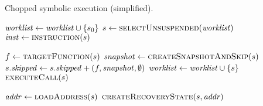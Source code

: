 

\begin{algorithm} %
\caption{Chopped symbolic execution (simplified).\label{fig:chopped-symbexe-recover}\label{fig:chopped-symbexe} }
\begin{algorithmic}[1]
  \State $\mathit{worklist} \gets \mathit{worklist} \cup \{ s_0\}$  \label{alg:seed-worklist}
  \While{$\worklist \neq \emptyset$}                     \label{alg:iterate-worklist}
    \State $\workstate \gets  \Call{selectUnsuspended}{\worklist}$ \label{alg:pop-worklist}
    \State $\inst \gets  \Call{instruction}{\workstate}$ \label{alg:get-switch-inst}

    \Switch{$\inst$} \label{alg:switch}
     \label{alg:casecall-begin}
      \State $f \gets  \Call{targetFunction}{\workstate}$ \label{alg:call-find-target}
        \State $\snapshot \gets \Call{createSnapshotAndSkip}{\workstate}$ \label{alg:take-snapshot}
        \State $s.\mathit{skipped} \gets s.\mathit{skipped} + (f,\mathit{snapshot},\emptyset)$ \label{alg:record-snapshot}
        \State $\mathit{worklist}  \gets  \mathit{worklist}  \cup \{s\}$ \label{alg:push-worklist-call}
      \Else
        \State $\Call{executeCall}{\workstate}$ \label{alg:call-normal}
      \EndIf
    \EndCase \label{alg:casecall-end}


     \label{alg:caseload-begin}
      \State $\addr \gets \Call{loadAddress}{\workstate}$
        \State $\Call{createRecoveryState}{\workstate,\addr}$ \label{alg:call-recover}

      \Else
      \State {}  \label{alg:load-normal}
      \EndIf
   \EndCase \label{alg:caseload-end}


\end{algorithmic}
\end{algorithm}
